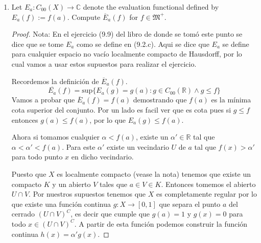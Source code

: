 \documentclass[letter,twoside,12pt]{article}
\begin{document}
\begin{enumerate}
\begin{enumerate}
\begin{proof}
Por lo tanto, $\overline{S}(\chi_U) = \infty$.

De manera analoga podemos demostrar que para $U = (-\infty, a)$ y $U = (-\infty,\infty)$, $\overline{S}(\chi_U) = \infty $. Lo que nos permite concluir que para cualquier intervalo abierto $U = (a,b)$ con $a,b \in \mathbb{R} \cup \{-\infty,+\infty\}$, $\overline{S}(\chi_U)=b-a$.

Por ultimo, para generalizar a cualquier abierto $U$ en $\mathbb{R}$ podemos utilizar el teorema (6.59) del libro que dice que existe una única colección contable de intervalos abiertos disyuntos $\mathfrak{U}=\{V_n\}$ tales que $\displaystyle\bigcup_{n \in \mathbb{N}} V_n= U$. Podemos escribir $V_n $ como $(a_n,b_n)$ con $a_n, b_n \in \mathbb{R} \cup \{-\infty,+\infty\}$.
Luego tenemos que $\displaystyle \chi_U = \sum_{n \in \mathbb{N}} \chi_{V_n} $ y por el colorario (9.14) concluimos que
$$ \overline{S}(\chi_U) = \overline{S}(\sum_{n \in \mathbb{N}} \chi_{V_n}) = \sum_{n \in \mathbb{N}} \overline{S}(V_N) = \sum_{n \in \mathbb{N}} (b_n-a_n) $$.
\end{proof}
\item  Let $E_a : C_{00}(X) \rightarrow \mathbb{C}$ denote the evaluation functional defined by $E_a(f) := f(a).$
Compute $\overline{E}_a(f)$ for $f \in \mathfrak{M}^+$.
\begin{proof}

Nota: En el ejercicio (9.9) del libro de donde se tomó este punto se dice que se tome $E_a$ como se define en (9.2.c). Aqui se dice que $E_a$ se define para cualquier espacio no vacío localmente compacto de Hausdorff, por lo cual vamos a usar estos supuestos para realizar el ejercicio. 

Recordemos la definición de $\overline{E}_a(f)$. $$\overline{E_a}(f) = \text{sup}\{E_a(g) = g(a): g \in C_{00}(\mathbb{R}) \wedge g \leq f\} $$
Vamos a probar que $ \overline{E}_a(f) = f(a) $ demostrando que $f(a)$ es la mínima cota superior del conjunto. Por un lado es facil ver que es cota pues si $ g \leq f $ entonces $ g(a) \leq f(a) $, por lo que $E_a(g)\leq f(a)$. 



Ahora si tomamos cualquier $\alpha < f(a) $, existe un $\alpha' \in \mathbb{R} $ tal que $\alpha < \alpha' < f(a)$. Para este $\alpha'$ existe un vecindario $U$ de $a$ tal que $f(x)>\alpha' $ para todo punto $ x $ en dicho vecindario. 

Puesto que $X$ es localmente compacto (vease la nota) tenemos que existe un compacto $ K $ y un abierto $V$ tales que $ a \in V \in K $. Entonces tomemos el abierto $ U \cap V $. Por nuestros supuestos tenemos que $X$ es completamente regular por lo que existe una función continua $g: X \rightarrow [0,1] $ que separa el punto $a$ del cerrado $ (U \cap V)^C $, es decir que cumple que $ g(a) = 1 $ y $g(x) = 0$ para todo $x \in (U \cap V)^C $. A partir de esta función podemos construir la función continua $h(x)= \alpha'g(x)$.


\end{proof}
\end{enumerate}
\end{enumerate}
\end{document}
